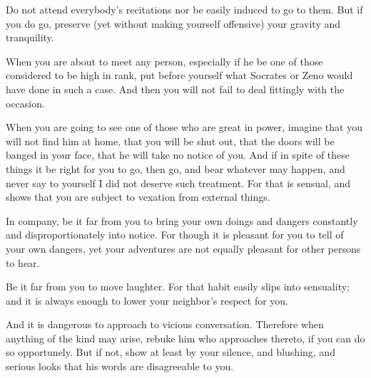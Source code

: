 Do not attend everybody's recitations nor be  easily induced to go to them. But
if you do go, preserve (yet without making yourself offensive) your gravity and
tranquility.

When  you are  about to  meet any  person,  especially if  he be  one of  those
considered to be high in rank, put  before yourself what Socrates or Zeno would
have done in such a case. And then you will not fail to deal fittingly with the
occasion.

When you are going to see one of those who are great in power, imagine that you
will not find  him at home, that you  will be shut out, that the  doors will be
banged in  your face, that he  will take no notice  of you. And if  in spite of
these things it be right for you to  go, then go, and bear whatever may happen,
and  never say  to yourself  I  did not  deserve  such treatment.  For that  is
sensual, and shows that you are subject to vexation from external things.

In company, be it far from you  to bring your own doings and dangers constantly
and disproportionately into  notice. For though it is pleasant  for you to tell
of your  own dangers, yet  your adventures are  not equally pleasant  for other
persons to hear.

Be  it  far from  you  to  move laughter.  For  that  habit easily  slips  into
sensuality; and it is always enough to lower your neighbor's respect for you.

And  it  is dangerous  to  approach  to  vicious conversation.  Therefore  when
anything of the kind  may arise, rebuke him who approaches  thereto, if you can
do so opportunely. But if not, show at least by your silence, and blushing, and
serious looks that his words are disagreeable to you.
